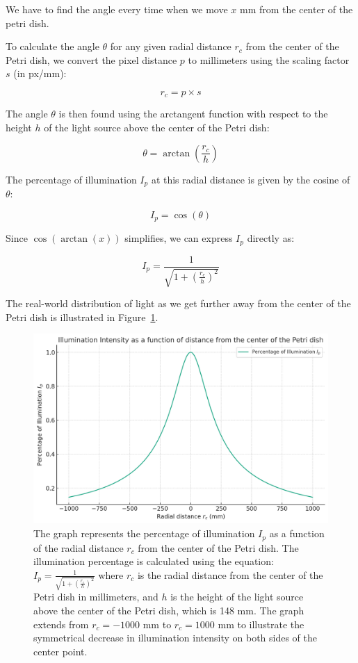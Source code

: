 We have to find the angle every time when we move \( x \) mm from the center of the petri dish.

To calculate the angle \( \theta \) for any given radial distance \( r_c \) from the center of the Petri dish, we convert the pixel distance \( p \) to millimeters using the scaling factor \( s \) (in px/mm):

\[ r_c = p \times s \]

The angle \( \theta \) is then found using the arctangent function with respect to the height \( h \) of the light source above the center of the Petri dish:

\[ \theta = \arctan\left(\frac{r_c}{h}\right) \]

The percentage of illumination \( I_p \) at this radial distance is given by the cosine of \( \theta \):

\[ I_p = \cos(\theta) \]

Since \( \cos(\arctan(x)) \) simplifies, we can express \( I_p \) directly as:

\[ I_p = \frac{1}{\sqrt{1 + \left(\frac{r_c}{h}\right)^2}} \]

The real-world distribution of light as we get further away from the center of the Petri dish is illustrated in Figure~\ref{fig:illumination-percentage}.

\begin{figure}
    \centering
    \includegraphics[width=1\linewidth]{images/831353b8-f4b4-4a93-9c41-ba3d6b6f5811.jpg}
    \caption{The graph represents the percentage of illumination $I_p$ as a function of the radial distance $r_c$ from the center of the Petri dish. The illumination percentage is calculated using the equation:$I_p = \frac{1}{\sqrt{1 + \left(\frac{r_c}{h}\right)^2}}$
    where \( r_c \) is the radial distance from the center of the Petri dish in millimeters, and \( h \) is the height of the light source above the center of the Petri dish, which is 148 mm. The graph extends from \( r_c = -1000 \) mm to \( r_c = 1000 \) mm to illustrate the symmetrical decrease in illumination intensity on both sides of the center point.}
    \label{fig:illumination-percentage}
\end{figure}



